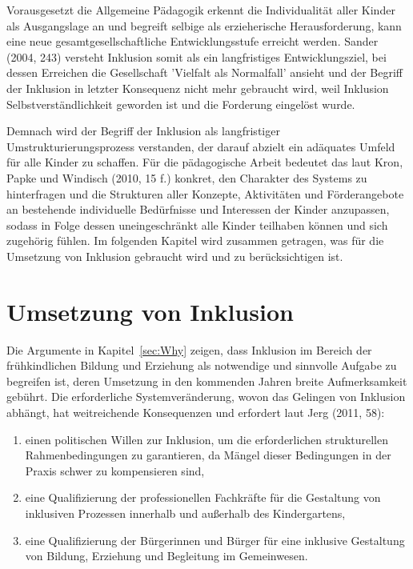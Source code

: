 Vorausgesetzt die Allgemeine Pädagogik erkennt die Individualität aller Kinder als Ausgangslage an und begreift selbige als erzieherische Herausforderung, kann eine neue gesamtgesellschaftliche Entwicklungsstufe erreicht werden. Sander (2004, 243) versteht Inklusion somit als ein langfristiges Entwicklungsziel, bei dessen Erreichen die Gesellschaft 'Vielfalt als Normalfall' ansieht und der Begriff der Inklusion in letzter Konsequenz nicht mehr gebraucht wird, weil Inklusion Selbstverständlichkeit geworden ist und die Forderung eingelöst wurde.  

Demnach wird der Begriff der Inklusion als langfristiger Umstrukturierungsprozess verstanden, der darauf abzielt ein adäquates  Umfeld für alle Kinder zu schaffen. Für die pädagogische Arbeit bedeutet das laut Kron, Papke und Windisch (2010, 15 f.) konkret, den Charakter des Systems zu hinterfragen und die Strukturen aller Konzepte, Aktivitäten und Förderangebote an bestehende individuelle Bedürfnisse und Interessen der Kinder anzupassen, sodass in Folge dessen uneingeschränkt alle Kinder teilhaben können und sich zugehörig fühlen.
Im folgenden Kapitel wird zusammen getragen, was für die Umsetzung von Inklusion gebraucht wird und zu berücksichtigen ist.

\section{Umsetzung von Inklusion}
\label{sec:Wie} 

Die Argumente in Kapitel~\ref{sec:Why} zeigen, dass Inklusion im Bereich der frühkindlichen Bildung und Erziehung als notwendige und sinnvolle Aufgabe zu begreifen ist, deren Umsetzung in den kommenden Jahren breite Aufmerksamkeit gebührt. Die erforderliche Systemveränderung, wovon das Gelingen von Inklusion abhängt, hat weitreichende Konsequenzen und erfordert laut Jerg (2011, 58):

\begin{enumerate}
\item einen politischen Willen zur Inklusion, um die erforderlichen strukturellen Rahmenbedingungen zu garantieren, da Mängel dieser Bedingungen in der Praxis schwer zu kompensieren sind,
\item eine Qualifizierung der professionellen Fachkräfte für die Gestaltung von inklusiven Prozessen innerhalb und außerhalb des Kindergartens,
\item eine Qualifizierung der Bürgerinnen und Bürger für eine inklusive Gestaltung von Bildung, Erziehung und Begleitung im Gemeinwesen.
\end{enumerate}

